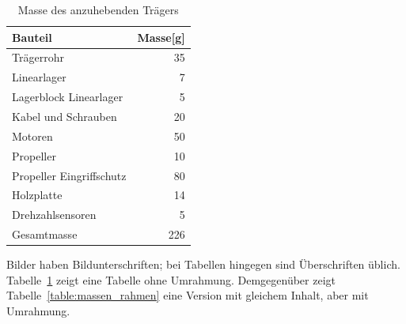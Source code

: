 \begin{table}[H]
  \caption{Masse des anzuhebenden Trägers%
           \label{table:massen}}
  \medskip
  \begin{center}
    \begin{tabular}{l|r}
      Bauteil                  & Masse[g] \\
      \hline
      Trägerrohr               &       35 \\
      Linearlager              &        7 \\
      Lagerblock Linearlager   &        5 \\
      Kabel und Schrauben      &       20 \\
      Motoren                  &       50 \\
      Propeller                &       10 \\
      Propeller Eingriffschutz &       80 \\
      Holzplatte               &       14 \\
      Drehzahlsensoren         &        5 \\
      \hline
      Gesamtmasse              &      226 \\
    \end{tabular}
  \end{center}
\end{table}

%
\goodbreak

Bilder haben Bildunterschriften;
bei Tabellen hingegen sind Überschriften üblich.
Tabelle~\ref{table:massen} zeigt eine Tabelle ohne Umrahmung. 
Demgegenüber zeigt Tabelle~\ref{table:massen_rahmen}
eine Version mit gleichem Inhalt, aber mit Umrahmung. 

\goodbreak

